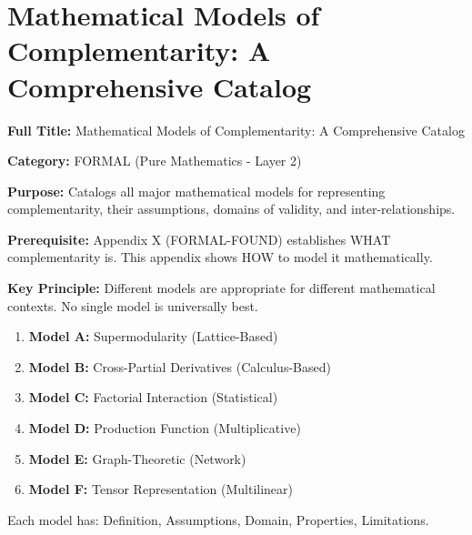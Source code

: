 
\chapter{Mathematical Models of Complementarity: A Comprehensive Catalog}
\label{app:formal-models}

\begin{tcolorbox}[colback=blue!5!white,colframe=blue!75!black,title=\textbf{Appendix XI: FORMAL-MODELS}]
\textbf{Full Title:} Mathematical Models of Complementarity: A Comprehensive Catalog

\textbf{Category:} FORMAL (Pure Mathematics - Layer 2)

\textbf{Purpose:} Catalogs all major mathematical models for representing complementarity, their assumptions, domains of validity, and inter-relationships.

\textbf{Prerequisite:} Appendix X (FORMAL-FOUND) establishes WHAT complementarity is. This appendix shows HOW to model it mathematically.

\textbf{Key Principle:} Different models are appropriate for different mathematical contexts. No single model is universally best.
\end{tcolorbox}

\begin{tcolorbox}[colback=gray!5!white,colframe=gray!75!black,title=\textbf{The Six Canonical Models}]
\small
\begin{enumerate}[noitemsep]
    \item \textbf{Model A:} Supermodularity (Lattice-Based)
    \item \textbf{Model B:} Cross-Partial Derivatives (Calculus-Based)
    \item \textbf{Model C:} Factorial Interaction (Statistical)
    \item \textbf{Model D:} Production Function (Multiplicative)
    \item \textbf{Model E:} Graph-Theoretic (Network)
    \item \textbf{Model F:} Tensor Representation (Multilinear)
\end{enumerate}

Each model has: Definition, Assumptions, Domain, Properties, Limitations.
\end{tcolorbox}

